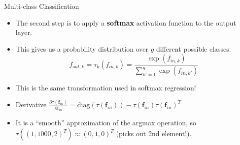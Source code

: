 \begin{frame} {Multi-class Classification}
  \begin{itemize}
    \item The second step is to apply a \textbf{softmax} activation function to the output layer.
    \vspace{4mm}
    \item This gives us a probability distribution over $g$ different possible classes:
    $$ f_{out,k} = \tau_k(f_{in,k}) = \frac{\exp(f_{in,k})}{\sum_{k'=1}^g\exp(f_{in,k'})}$$
    \vspace{2mm}
    \item This is the same transformation used in softmax regression!
    \vspace{4mm}
    \item Derivative $ \frac{\partial \tau(\mathbf{f}_{in})}{\partial \mathbf{f}_{in}} = \text{diag}(\tau(\mathbf{f}_{in})) - \tau(\mathbf{f}_{in}) \tau(\mathbf{f}_{in})^T $
    \vspace{4mm}
    \item It is a \enquote{smooth} approximation of the argmax operation,
        so $\tau((1, 1000, 2)^T) \approx (0, 1, 0)^T$ (picks out 2nd element!).
  \end{itemize}
\end{frame}

